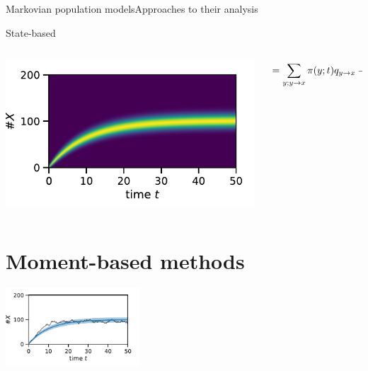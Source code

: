 \documentclass[9pt]{beamer}
\begin{document}
\begin{frame}{Markovian population models}{Approaches to their analysis}
\begin{block}{State-based}
\begin{columns}
                  \begin{column}{.4\textwidth}
                      \centering
    \includegraphics[width=\textwidth]{../gfx/bd_dist.pdf}
                  \end{column}
                  \begin{column}{.45\textwidth}
                      \vspace{-2em}
                      \[
                      \hspace{-4em}
                      \frac{d}{dt}\pi(x;t)= \sum_{y;y\to x}\pi(y;t)q_{y\to x} - \pi(x;t)q_{x\to y}
        \]
                  \end{column}
              \end{columns}
          \end{block}
\end{frame}

\section{Moment-based methods}
\begin{frame}
  \vfill
  \centering
    \insertsectionhead\par%
    \vspace{1cm}
    \includegraphics[width=5cm]{../gfx/momsandsims.pdf}
  \vfill
\end{frame}
\end{document}
